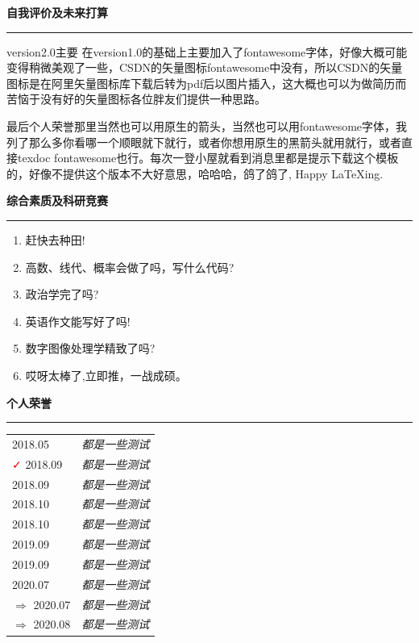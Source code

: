 \documentclass[a4paper,12pt,final,UTF8,fontset=macnew]{memoir}
\newcommand{\SmallSep}{\vspace{0.9em}}
\newcommand{\CVSection}[1]
	{\Large\textbf{#1}\par\smallskip
     \hrule%
     \smallskip
	 \normalsize\normalfont}
\begin{document}
\CVSection{自我评价及未来打算}
	 \vspace{1em}
	 {
	 \begin{varwidth}{32em}
	 	 \setlength\parindent{2em}
 	\par version2.0主要 在version1.0的基础上主要加入了fontawesome字体，好像大概可能变得稍微美观了一些，CSDN的矢量图标fontawesome中没有，所以CSDN的矢量图标是在阿里矢量图标库下载后转为pdf后以图片插入，这大概也可以为做简历而苦恼于没有好的矢量图标各位胖友们提供一种思路。
	\par 最后个人荣誉那里当然也可以用原生的箭头，当然也可以用fontawesome字体，我列了那么多你看哪一个顺眼就下就行，或者你想用原生的黑箭头就用就行，或者直接texdoc fontawesome也行。每次一登小屋就看到消息里都是提示下载这个模板的，好像不提供这个版本不大好意思，哈哈哈，鸽了鸽了, Happy \LaTeX ing.
	  \end{varwidth}
	}

\vspace{2em}

\CVSection{综合素质及科研竞赛} 
	\begin{varwidth}{32em}
	\begin{enumerate}
		\item 赶快去种田!
		\item 高数、线代、概率会做了吗，写什么代码?
		\item 政治学完了吗?
		\item 英语作文能写好了吗!
		\item 数字图像处理学精致了吗?
		\item 哎呀太棒了,立即推，一战成硕。
	\end{enumerate}
	\end{varwidth}

\vspace{2.5em}
\CVSection{个人荣誉} 
	\begin{table}[h]
	\begin{tabular}{l|l}
		\textcolor{red}{\faArrowRight}   2018.05&\textit{都是一些测试}\footnotesize\\
		\textcolor{red}{\faCheck} 			  2018.09&\textit{都是一些测试}\\
		\textcolor{red}{\faHandPeaceO}  2018.09&\textit{都是一些测试}\\
		\textcolor{red}{\faStar }                 2018.10&\textit{都是一些测试}\\
		\textcolor{red}{\faThumbsOUp}  2018.10&\textit{都是一些测试}\\
		\textcolor{red}{\faHandORight}	2019.09&\textit{都是一些测试}\\
		\textcolor{red}{\faToggleOn}       2019.09&\textit{都是一些测试}\footnotesize\\ 
		\textcolor{red}{\faSignIn}   2020.07&\textit{都是一些测试}\footnotesize\\
		$\Rightarrow$								    2020.07&\textit{都是一些测试}\footnotesize\\
		$\Rightarrow$								    2020.08&\textit{都是一些测试}\footnotesize\\
	\end{tabular}
\end{table}
\end{document}
